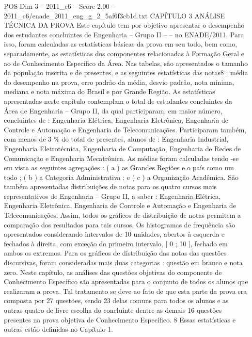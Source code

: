 \begin{textsample}{POS Dim 3 – 2011\_c6 – Score 2.00 – 2011\_c6/enade\_2011\_eng\_g\_2\_5af6f3cb1d.txt}  \label{ex:f3_pos_207}
CAPÍTULO 3 ANÁLISE TÉCNICA DA PROVA Este capítulo tem por objetivo apresentar o desempenho dos estudantes concluintes de Engenharia – Grupo II – – no ENADE/2011.
Para isso, foram calculadas as estatísticas básicas da prova em seu todo, bem como, separadamente, as estatísticas dos componentes relacionadas à Formação Geral e ao de Conhecimento Específico da Área.
Nas tabelas, são apresentados o tamanho da população inscrita e de presentes, e as seguintes estatísticas das notas8 : média do desempenho na prova, erro padrão da média, desvio padrão, nota mínima, mediana e nota máxima do Brasil e por Grande Região.
As estatísticas apresentadas neste capítulo contemplam o total de estudantes concluintes da Área de Engenharia – Grupo II, da qual participaram, em maior número, concluintes de : Engenharia Elétrica, Engenharia Eletrônica, Engenharia de Controle e Automação e Engenharia de Telecomunicações.
Participaram também, com menos de 3 \% do total de presentes, alunos de : Engenharia Industrial, Engenharia Eletrotécnica, Engenharia de Computação, Engenharia de Redes de Comunicação e Engenharia Mecatrônica.
As médias foram calculadas tendo -se em vista as seguintes agregações : ( a ) as Grandes Regiões e o país como um todo ; ( b ) a Categoria Administrativa ; e ( c ) a Organização Acadêmica.
São também apresentadas distribuições de notas para os quatro cursos mais representativos de Engenharia – Grupo II, a saber : Engenharia Elétrica, Engenharia Eletrônica, Engenharia de Controle e Automação e Engenharia de Telecomunicações.
Assim, todos os gráficos de distribuição de notas permitem a comparação dos resultados para tais cursos.
Os histogramas de frequência são apresentados considerando intervalos de 10 unidades, abertos à esquerda e fechados à direita, com exceção do primeiro intervalo, [ 0 ; 10 ], fechado em ambos os extremos.
Para os gráficos de distribuição das notas das questões discursivas, foram consideradas mais duas categorias : questão em branco e nota zero.
Neste capítulo, as análises das questões objetivas do componente de Conhecimento Específico são apresentadas para o conjunto de todos os alunos que realizaram a prova.
Tal tratamento se deve ao fato de que esta parte da prova era composta por 27 questões, sendo 23 delas comuns para todos os alunos e as outras quatro de livre escolha do concluinte dentre as demais 16 questões presentes na prova objetiva de Conhecimento Específico. 8 Essas estatísticas e outras estão definidas no Capítulo 1.

\end{textsample}
